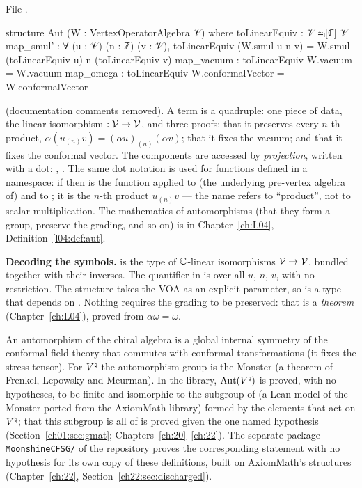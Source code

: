 \begin{example}\label{ch01:ex:aut}
\noindent File .
\begin{leancode}
structure Aut (W : VertexOperatorAlgebra 𝒱) where
  toLinearEquiv : 𝒱 ≃ₗ[ℂ] 𝒱
  map_smul' : ∀ (u : 𝒱) (n : ℤ) (v : 𝒱),
    toLinearEquiv (W.smul u n v) = W.smul (toLinearEquiv u) n (toLinearEquiv v)
  map_vacuum : toLinearEquiv W.vacuum = W.vacuum
  map_omega : toLinearEquiv W.conformalVector = W.conformalVector
\end{leancode}
(documentation comments removed). A term  is a quadruple: one piece of data, the
linear isomorphism  $:\mathcal{V}\to\mathcal{V}$, and three proofs: that it preserves
every $n$-th product, $\alpha(u_{(n)}v) = (\alpha u)_{(n)}(\alpha v)$; that it fixes the vacuum;
and that it fixes the conformal vector. The components are accessed by \emph{projection}, written
with a dot: , . The same dot notation is used for functions
defined in a namespace: if  then  is the
function  applied to (the underlying pre-vertex algebra of)  and to
; it is the $n$-th product $u_{(n)}v$ --- the name  refers to ``product'', not
to scalar multiplication. The mathematics of automorphisms (that they form a group, preserve the
grading, and so on) is in Chapter~\ref{ch:L04}, Definition~\ref{l04:def:aut}.
\end{example}

\begin{dictionary}
\textbf{Decoding the symbols.}  is the type of ${\mathbb{C}}$-linear isomorphisms
$\mathcal{V}\to\mathcal{V}$, bundled together with their inverses. The quantifier in  is over
all $u$, $n$, $v$, with no restriction. The structure takes the VOA  as an explicit
parameter, so  is a type that depends on . Nothing requires the grading to be
preserved: that is a \emph{theorem} (Chapter~\ref{ch:L04}), proved from $\alpha\omega = \omega$.
\end{dictionary}

\begin{physics}
An automorphism of the chiral algebra is a global internal symmetry of the conformal field theory
that commutes with conformal transformations (it fixes the stress tensor). For ${V^{\natural}}$ the
automorphism group is the Monster (a theorem of Frenkel, Lepowsky and Meurman). In the library,
$\operatorname{Aut}({V^{\natural}})$ is proved, with no hypotheses, to be finite and isomorphic to the subgroup of  (a Lean model
of the Monster ported from the AxiomMath library) formed by the elements that act on ${V^{\natural}}$; that this subgroup is all
of  is proved given the one named hypothesis  (Section~\ref{ch01:sec:gmat};
Chapters~\ref{ch:20}--\ref{ch:22}). The separate package \texttt{MoonshineCFSG/} of the repository proves the
corresponding statement with no hypothesis for its own copy of these definitions, built on AxiomMath's structures
(Chapter~\ref{ch:22}, Section~\ref{ch22:sec:discharged}).
\end{physics}

